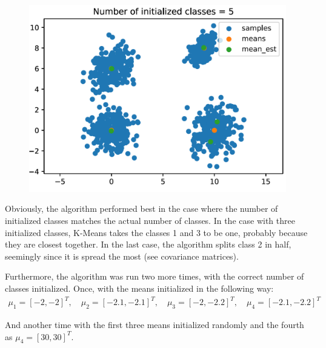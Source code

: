 \documentclass[DIV=12, ngerman, fontsize=12pt, parskip=half]{scrreprt}
\begin{document}
\begin{figure}[H]
\begin{center}
\begin{minipage}[b]{0.35\textwidth}
				\includegraphics[width=\textwidth]{Task3_classes5_png}
			\end{minipage}
		\end{center}
	\end{figure}	

	Obviously, the algorithm performed best in the case where the number of initialized classes matches the actual number of classes. In the case with three initialized classes, K-Means takes the classes 1 and 3 to be one, probably because they are closest together. In the last case, the algorithm splits class 2 in half, seemingly since it is spread the most (see covariance matrices).


	Furthermore, the algorithm was run two more times, with the correct number of classes initialized. Once, with the means initialized in the following way:
	\begin{align*}
		\mu_1 = [-2,-2]^T, \quad \mu_2 = [-2.1,-2.1]^T, \quad \mu_3 = [-2,-2.2]^T, \quad \mu_4 = [-2.1,-2.2]^T
	\end{align*}

	And another time with the first three means initialized randomly and the fourth as $\mu_4 = [30,30]^T$. 
	
\end{document}
